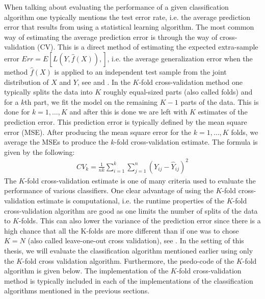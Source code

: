 \documentclass[../thesis.tex]{subfiles}
\begin{document}
\noindent When talking about evaluating the performance of a given classification algorithm one typically mentions the test error rate, i.e. the average prediction error that results from using a statistical learning algorithm. The most common way of estimating the average prediction error is through the way of cross-validation (CV). This is a direct method of estimating the expected extra-sample error $Err = E\left[L\left(Y, \hat{f}\left(X \right) \right), \right]$, i.e. the average generalization error when the method $\hat{f}\left(X \right)$ is applied to an independent test sample from the joint distribution of $X$ and $Y$, see \citep{friedman2009elements} and \citep{james2013introduction}. In the $K$-fold cross-validation method \citep{geisser1975predictive} one typically splits the data into $K$ roughly equal-sized parts (also called folds) and for a $k$th part, we fit the model on the remaining $K-1$ parts of the data. This is done for $k = 1, \hdots, K$ and after this is done we are left with $K$ estimates of the prediction error. This prediction error is typically defined by the mean square error (MSE). After producing the mean square error for the $k = 1, \hdots, K$ folds, we average the MSEs to produce the $k$-fold cross-validation estimate. The formula is given by the following:
\begin{align}
    CV_k = \frac{1}{nk}\sum_{i=1}^k\sum_{j=1}^n\left(Y_{ij} - \hat{Y}_{ij} \right)^2
\end{align}
\noindent The $K$-fold cross-validation estimate is one of many criteria used to evaluate the performance of various classifiers. One clear advantage of using the $K$-fold cross-validation estimate is computational, i.e. the runtime properties of the $K$-fold cross-validation algorithm are good as one limits the number of splits of the data to $K$-folds. This can also lower the variance of the prediction error since there is a high chance that all the K-folds are more different than if one was to chose $K = N$ (also called leave-one-out cross validation), see \citep{friedman2009elements}. In the setting of this thesis, we will evaluate the classification algorithm mentioned earlier using only the $K$-fold cross validation algorithm. Furthermore, the psedo-code of the $K$-fold algorithm is given below. The implementation of the $K$-fold cross-validation method is typically included in each of the implementations of the classification algorithms mentioned in the previous sections.
\end{document}
